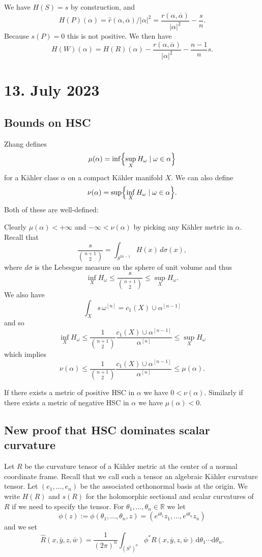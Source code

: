 \documentclass[11pt]{amsart}
\theoremstyle{definition}
\newcommand{\kk}[1]{\mathbb{#1}}
\def\^#1{^{[#1]}}
\def\ov#1{\overline{#1}}
\def\d{\mathrm{d}}
\begin{document}
We have $H(S) = s$ by construction, and
$$
H(P)(\alpha)
= \hat r(\alpha, \ov\alpha) / |\alpha|^2
= \frac{r(\alpha, \ov\alpha)}{|\alpha|^2} - \frac{s}{n}.
$$
Because $s(P) = 0$ this is not positive.
We then have
$$
H(W)(\alpha)
= H(R)(\alpha)
- \frac{r(\alpha, \ov\alpha)}{|\alpha|^2}
- \frac{n-1}{n} s.
$$


\section{13. July 2023}

\subsection*{Bounds on HSC}

Zhang defines
$$
\mu(\alpha)
= \inf \Bigl\{ \sup_X H_\omega \mid \omega \in \alpha \Bigr\}
$$
for a K\"ahler class $\alpha$ on a compact K\"ahler manifold $X$.
We can also define
$$
\nu(\alpha)
= \sup \Bigl\{ \inf_X H_\omega \mid \omega \in \alpha \Bigr\}.
$$
Both of these are well-defined:

Clearly $\mu(\alpha) < +\infty$ and $-\infty < \nu(\alpha)$ by picking
any K\"ahler metric in $\alpha$.
Recall that
$$
\frac{s}{\binom{n+1}{2}} = \int_{S^{2n-1}} H(x) \, d\sigma(x),
$$
where $d\sigma$ is the Lebesgue measure on the sphere of unit volume
and thus
$$
\inf_X H_\omega
\leq \frac{s}{\binom{n+1}{2}}
\leq \sup_X H_\omega.
$$
We also have
$$
\int_X s \, \omega\^n
= c_1(X) \cup \alpha\^{n-1}
$$
and so
$$
\inf_X H_\omega
\leq \frac{1}{\binom{n+1}{2}} \frac{c_1(X) \cup \alpha\^{n-1}}{\alpha\^n}
\leq \sup_X H_\omega
$$
which implies
$$
\nu(\alpha)
\leq \frac{1}{\binom{n+1}{2}} \frac{c_1(X) \cup \alpha\^{n-1}}{\alpha\^n}
\leq \mu(\alpha).
$$

If there exists a metric of positive HSC in $\alpha$ we have $0 < \nu(\alpha)$.
Similarly if there exists a metric of negative HSC in $\alpha$ we have
$\mu(\alpha) < 0$.


\subsection*{New proof that HSC dominates scalar curvature}

Let $R$ be the curvature tensor of a K\"ahler metric at the center
of a normal coordinate frame.
Recall that we call such a tensor an algebraic K\"ahler curvature tensor.
Let $(e_1,\ldots,e_n)$ be the associated orthonormal basis at the origin.
We write $H(R)$ and $s(R)$ for the holomorphic sectional and scalar
curvatures of $R$ if we need to specify the tensor.
For $\theta_1, \ldots, \theta_n \in \kk R$ we let
$$
\phi(z)
:= \phi(\theta_1, \ldots, \theta_n, z)
= (e^{i\theta_1} z_1, \ldots, e^{i\theta_n} z_n)
$$
and we set
$$
\widehat R(x, \bar y, z, \bar w)
= \frac{1}{(2\pi)^n} \int_{(S^1)^n}
\phi^* R(x, \bar y, z, \bar w) \, \d\theta_1 \cdots \d\theta_n.
$$
\end{document}
